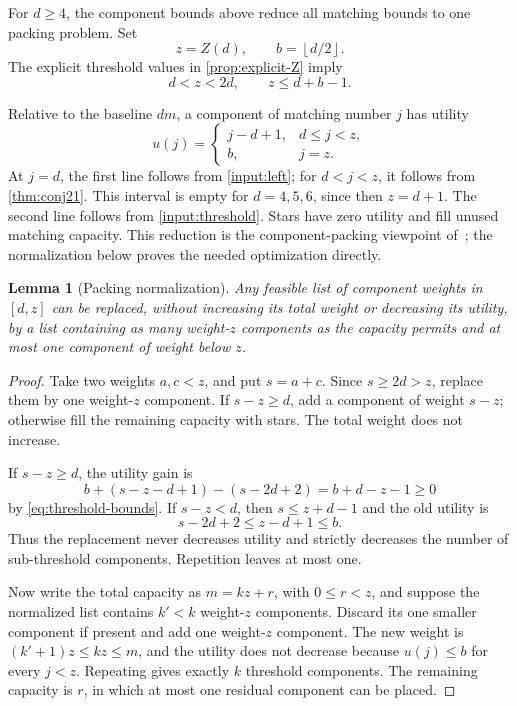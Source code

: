 \documentclass[11pt]{article}
\newtheorem{lemma}[theorem]{Lemma}
\theoremstyle{definition}
\theoremstyle{remark}
\newcommand{\floor}[1]{\left\lfloor #1\right\rfloor}
\begin{document}
For $d\ge4$, the component bounds above reduce all matching bounds to one
packing problem. Set
\[
  z=Z(d),
  \qquad
  b=\floor{d/2}.
\]
The explicit threshold values in \cref{prop:explicit-Z} imply
\begin{equation}\label{eq:threshold-bounds}
  d<z<2d,
  \qquad
  z\le d+b-1.
\end{equation}

Relative to the baseline $dm$, a component of matching number $j$ has utility
\[
  u(j)=
  \begin{cases}
    j-d+1,&d\le j<z,\\
    b,&j=z.
  \end{cases}
\]
At $j=d$, the first line follows from \cref{input:left}; for $d<j<z$,
it follows from \cref{thm:conj21}. This interval is empty for $d=4,5,6$,
since then $z=d+1$. The second line follows from \cref{input:threshold}.
Stars have zero utility and fill unused matching capacity. This reduction
is the component-packing viewpoint of~\cite[Lemma~4.9]{AEY2022}; the
normalization below proves the needed optimization directly.

\begin{lemma}[Packing normalization]\label{lem:packing}
Any feasible list of component weights in $[d,z]$ can be replaced, without
increasing its total weight or decreasing its utility, by a list containing as
many weight-$z$ components as the capacity permits and at most one component
of weight below $z$.
\end{lemma}

\begin{proof}
Take two weights $a,c<z$, and put $s=a+c$. Since $s\ge2d>z$, replace them by
one weight-$z$ component. If $s-z\ge d$, add a component of weight $s-z$;
otherwise fill the remaining capacity with stars. The total weight does not
increase.

If $s-z\ge d$, the utility gain is
\[
  b+(s-z-d+1)-(s-2d+2)=b+d-z-1\ge0
\]
by \cref{eq:threshold-bounds}. If $s-z<d$, then $s\le z+d-1$ and the old
utility is
\[
  s-2d+2\le z-d+1\le b.
\]
Thus the replacement never decreases utility and strictly decreases the
number of sub-threshold components. Repetition leaves at most one.

Now write the total capacity as $m=kz+r$, with $0\le r<z$, and suppose the
normalized list contains $k'<k$ weight-$z$ components. Discard its one smaller
component if present and add one weight-$z$ component. The new weight is
$(k'+1)z\le kz\le m$, and the utility does not decrease because $u(j)\le b$
for every $j<z$. Repeating gives exactly $k$ threshold components. The
remaining capacity is $r$, in which at most one residual component can be
placed.
\end{proof}
\end{document}
